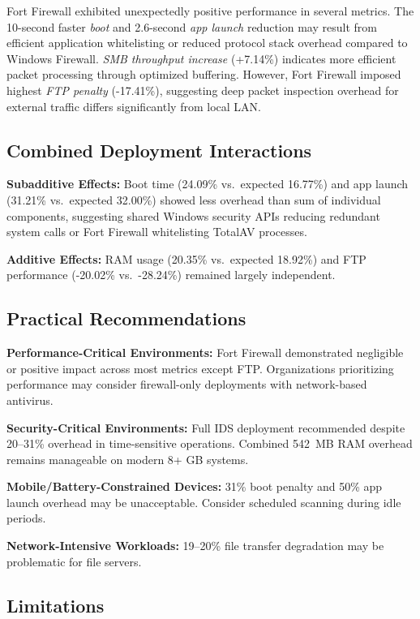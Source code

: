 \documentclass[runningheads,a4paper,english]{llncs}[2022/01/12]
\begin{document}
Fort Firewall exhibited unexpectedly positive performance in several metrics. The 10-second faster \textit{boot} and 2.6-second \textit{app launch} reduction may result from efficient application whitelisting or reduced protocol stack overhead compared to Windows Firewall. \textit{SMB throughput increase} (+7.14\%) indicates more efficient packet processing through optimized buffering. However, Fort Firewall imposed highest \textit{FTP penalty} (-17.41\%), suggesting deep packet inspection overhead for external traffic differs significantly from local LAN.

\subsection{Combined Deployment Interactions}

\textbf{Subadditive Effects:} Boot time (24.09\% vs.\ expected 16.77\%) and app launch (31.21\% vs.\ expected 32.00\%) showed less overhead than sum of individual components, suggesting shared Windows security APIs reducing redundant system calls or Fort Firewall whitelisting TotalAV processes.

\textbf{Additive Effects:} RAM usage (20.35\% vs.\ expected 18.92\%) and FTP performance (-20.02\% vs.\ -28.24\%) remained largely independent.

\subsection{Practical Recommendations}

\textbf{Performance-Critical Environments:} Fort Firewall demonstrated negligible or positive impact across most metrics except FTP. Organizations prioritizing performance may consider firewall-only deployments with network-based antivirus.

\textbf{Security-Critical Environments:} Full IDS deployment recommended despite 20--31\% overhead in time-sensitive operations. Combined 542~MB RAM overhead remains manageable on modern 8+ GB systems.

\textbf{Mobile/Battery-Constrained Devices:} 31\% boot penalty and 50\% app launch overhead may be unacceptable. Consider scheduled scanning during idle periods.

\textbf{Network-Intensive Workloads:} 19--20\% file transfer degradation may be problematic for file servers.

\subsection{Limitations}
\end{document}
